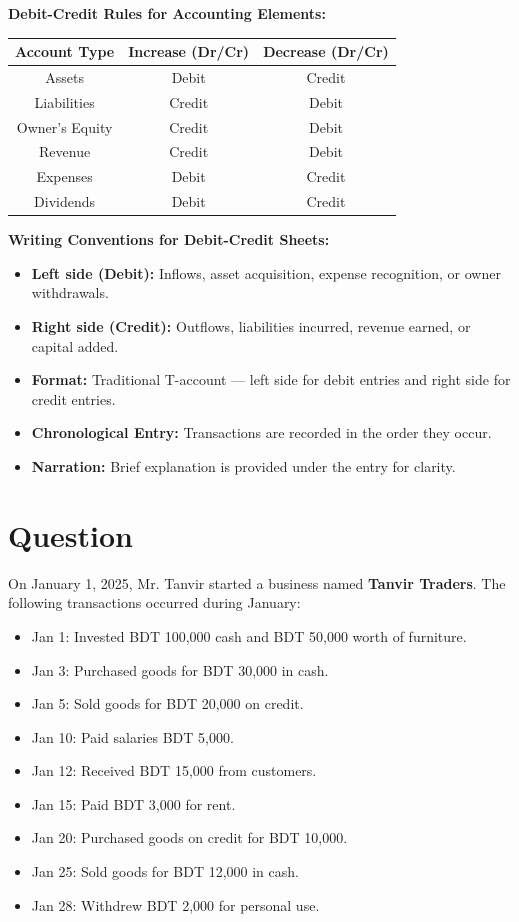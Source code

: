 \documentclass[12pt,a4paper]{book}
\begin{document}
\vspace{0.5cm}
\textbf{Debit-Credit Rules for Accounting Elements:}

\begin{center}
\begin{tabular}{|c|c|c|}
\hline
\textbf{Account Type} & \textbf{Increase (Dr/Cr)} & \textbf{Decrease (Dr/Cr)} \\
\hline
Assets & Debit & Credit \\
Liabilities & Credit & Debit \\
Owner’s Equity & Credit & Debit \\
Revenue & Credit & Debit \\
Expenses & Debit & Credit \\
Dividends & Debit & Credit \\
\hline
\end{tabular}
\end{center}

\vspace{0.5cm}
\textbf{Writing Conventions for Debit-Credit Sheets:}
\begin{itemize}
    \item \textbf{Left side (Debit):} Inflows, asset acquisition, expense recognition, or owner withdrawals.
    \item \textbf{Right side (Credit):} Outflows, liabilities incurred, revenue earned, or capital added.
    \item \textbf{Format:} Traditional T-account — left side for debit entries and right side for credit entries.
    \item \textbf{Chronological Entry:} Transactions are recorded in the order they occur.
    \item \textbf{Narration:} Brief explanation is provided under the entry for clarity.
\end{itemize}

\vspace{1cm}
\clearpage

\section*{Question}
On January 1, 2025, Mr. Tanvir started a business named \textbf{Tanvir Traders}. The following transactions occurred during January:
\begin{itemize}
    \item Jan 1: Invested BDT 100,000 cash and BDT 50,000 worth of furniture.
    \item Jan 3: Purchased goods for BDT 30,000 in cash.
    \item Jan 5: Sold goods for BDT 20,000 on credit.
    \item Jan 10: Paid salaries BDT 5,000.
    \item Jan 12: Received BDT 15,000 from customers.
    \item Jan 15: Paid BDT 3,000 for rent.
    \item Jan 20: Purchased goods on credit for BDT 10,000.
    \item Jan 25: Sold goods for BDT 12,000 in cash.
    \item Jan 28: Withdrew BDT 2,000 for personal use.
\end{itemize}
\end{document}
